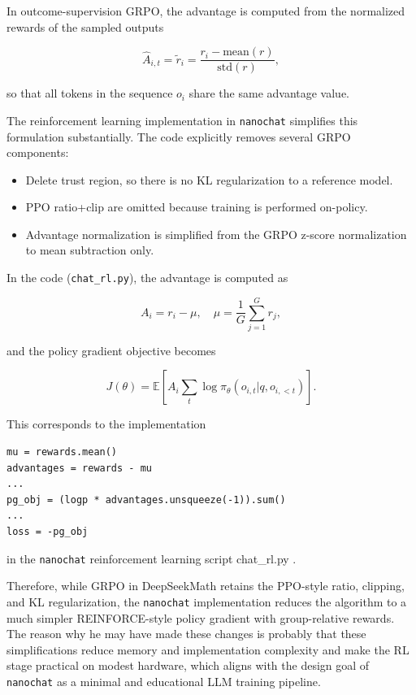 In outcome-supervision GRPO, the advantage is computed from the normalized rewards of the sampled outputs

\begin{equation}
\hat A_{i,t}
=
\tilde r_i
=
\frac{r_i - \mathrm{mean}(r)}{\mathrm{std}(r)},
\end{equation}

so that all tokens in the sequence $o_i$ share the same advantage value.

The reinforcement learning implementation in \texttt{nanochat} simplifies this formulation substantially. The code explicitly removes several GRPO components:

\begin{itemize}
\item Delete trust region, so there is no KL regularization to a reference model.
\item PPO ratio+clip are omitted because training is performed on-policy.
\item Advantage normalization is simplified from the GRPO z-score normalization to mean subtraction only.
\end{itemize}

In the code (\texttt{chat\_rl.py}), the advantage is computed as

\begin{equation}
A_i = r_i - \mu, \quad
\mu = \frac{1}{G}\sum_{j=1}^{G} r_j,
\end{equation}

and the policy gradient objective becomes

\begin{equation}
J(\theta)
=
\mathbb{E}
\left[
A_i
\sum_{t}
\log \pi_\theta(o_{i,t}|q,o_{i,<t})
\right].
\end{equation}

This corresponds to the implementation

\begin{verbatim}
mu = rewards.mean()
advantages = rewards - mu
...
pg_obj = (logp * advantages.unsqueeze(-1)).sum()
...
loss = -pg_obj
\end{verbatim}

in the \texttt{nanochat} reinforcement learning script chat\_rl.py \cite{karpathy2025nanochat}. 

Therefore, while GRPO in DeepSeekMath retains the PPO-style ratio, clipping, and KL regularization, the \texttt{nanochat} implementation reduces the algorithm to a much simpler REINFORCE-style policy gradient with group-relative rewards. The reason why he may have made these changes is probably that these simplifications reduce memory and implementation complexity and make the RL stage practical on modest hardware, which aligns with the design goal of \texttt{nanochat} as a minimal and educational LLM training pipeline.

